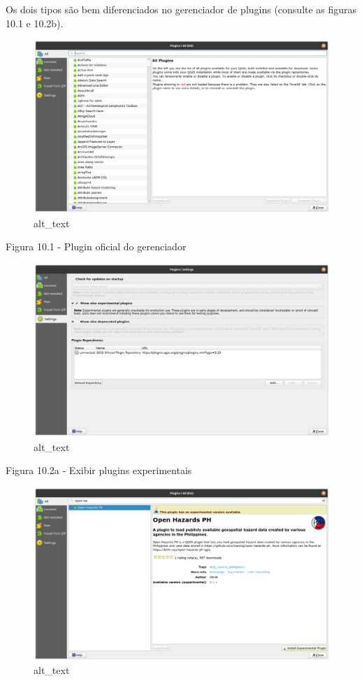 \documentclass[
  portuguese,
]{krantz}
\begin{document}
Os dois tipos são bem diferenciados no gerenciador de plugins (consulte as figuras 10.1 e 10.2b).

\begin{figure}
\centering
\includegraphics{media/modulo10/fig101.png}
\caption{alt\_text}
\end{figure}

Figura 10.1 - Plugin oficial do gerenciador

\begin{figure}
\centering
\includegraphics{media/modulo10/fig102_a.png}
\caption{alt\_text}
\end{figure}

Figura 10.2a - Exibir plugins experimentais

\begin{figure}
\centering
\includegraphics{media/modulo10/fig102_b.png}
\caption{alt\_text}
\end{figure}
\end{document}
